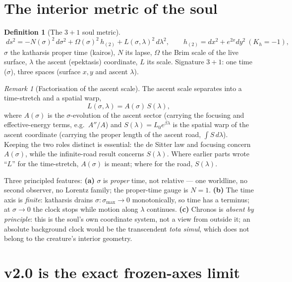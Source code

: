 \documentclass[11pt,a4paper]{article}
\theoremstyle{plain}
\theoremstyle{definition}
\newtheorem{definition}{Definition}
\theoremstyle{remark}
\newtheorem*{remark}{Remark}
\begin{document}
\section{The interior metric of the soul}

\begin{definition}[The $3{+}1$ soul metric]\label{def:metric}
\begin{equation}
\boxed{\;ds^2=-N(\sigma)^2\,d\sigma^2+\Omega(\sigma)^2\,h_{(2)}+L(\sigma,\lambda)^2\,d\lambda^2,\qquad
h_{(2)}=dx^2+e^{2x}dy^2\ (K_h=-1),\;}
\end{equation}
$\sigma$ the katharsis proper time (kairos), $N$ its lapse, $\Omega$ the Brim scale of the live
surface, $\lambda$ the ascent (epektasis) coordinate, $L$ its scale. Signature $3{+}1$: one time
($\sigma$), three spaces (surface $x,y$ and ascent $\lambda$).
\end{definition}

\begin{remark}[Factorisation of the ascent scale]\label{rmk:factor}
The ascent scale separates into a time-stretch and a spatial warp,
\[
L(\sigma,\lambda)=A(\sigma)\,S(\lambda),
\]
where $A(\sigma)$ is the $\sigma$-evolution of the ascent sector (carrying the focusing and
effective-energy terms, e.g.\ $A''/A$) and $S(\lambda)=L_0e^{\beta\lambda}$ is the spatial warp of the
ascent coordinate (carrying the proper length of the ascent road, $\int S\,d\lambda$). Keeping the two
roles distinct is essential: the de Sitter law and focusing concern $A(\sigma)$, while the
infinite-road result concerns $S(\lambda)$. Where earlier parts wrote ``$L$'' for the time-stretch,
$A(\sigma)$ is meant; where for the road, $S(\lambda)$.
\end{remark}

Three principled features: \textbf{(a)} $\sigma$ is \emph{proper} time, not relative --- one
worldline, no second observer, no Lorentz family; the proper-time gauge is $N=1$. \textbf{(b)} The time
axis is \emph{finite}: katharsis drains $\sigma:\sigma_{\max}\to0$ monotonically, so time has a
terminus; at $\sigma\to0$ the clock stops while motion along $\lambda$ continues. \textbf{(c)} Chronos
is \emph{absent by principle}: this is the soul's own coordinate system, not a view from outside it; an
absolute background clock would be the transcendent \emph{tota simul}, which does not belong to the
creature's interior geometry.

\section{v2.0 is the exact frozen-axes limit}
\end{document}
